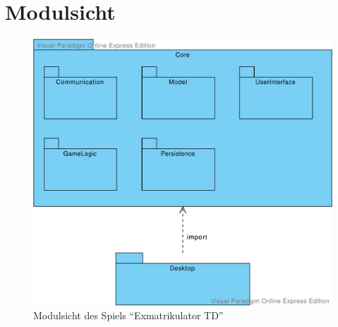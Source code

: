 \documentclass[enabledeprecatedfontcommands,fontsize=12pt,paper=a4,twoside,parskip=half]{scrartcl}
\begin{document}

\clearpage


\section{Modulsicht}

\label{sec:modulsicht}

\begin{figure}[H]
    \centering
    \includegraphics[width=\textwidth]{Bilder/Paketdiagramm.pdf}
    \caption{Modulsicht des Spiels \enquote{Exmatrikulator TD}}
    \label{fig:Paketdiagramm}
\end{figure}
\end{document}
